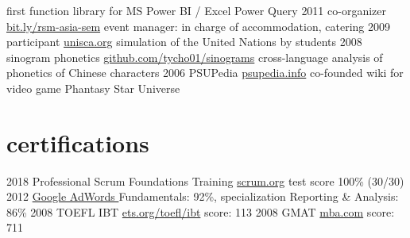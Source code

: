 \documentclass[]{friggeri-cv}
\begin{document}
\begin{entrylist}
    {
      first function library for
      MS Power BI / Excel Power Query
    }
  \entry
    {2011}
    {
      co-organizer
    }
    {\href{https://www.facebook.com/Doing-Business-in-Asia-Seminar-310520148998549/}{bit.ly/rsm-asia-sem}}
    {
      event manager:
      in charge of accommodation, catering
    }
  \entry
    {2009}
    {
      participant
    }
    {\href{http://unisca.org/}{unisca.org}}
    {
      simulation of the United Nations by students
    }
  \entry
    {2008}
    {
      sinogram phonetics
    }
    {\href{https://github.com/KiaraGrouwstra/sinograms}{github.com/tycho01/sinograms}}
    {
      cross-language analysis of phonetics of Chinese characters
    }
  \entry
    {2006}
    {PSUPedia}
    {\href{http://psupedia.info/}{psupedia.info}}
    {
      co-founded wiki for video game
      Phantasy Star Universe
    }
\end{entrylist}

\section{certifications}

\begin{entrylist}
  \entry
    {2018}
    {Professional Scrum Foundations Training}
    {\href{https://www.scrum.org/courses/professional-scrum-foundations-training}{scrum.org}}
    {test score 100\% (30/30)}
  \entry
    {2012}
    {\href{https://support.google.com/partners/answer/3154326}{Google AdWords }}
    {}
    {Fundamentals: 92\%,
    specialization
    Reporting \& Analysis: 86\%}
  \entry
    {2008}
    {TOEFL IBT}
    {\href{https://www.ets.org/toefl/ibt}{ets.org/toefl/ibt}}
    {score: 113}
  \entry
    {2008}
    {GMAT}
    {\href{https://www.mba.com/}{mba.com}}
    {score: 711}
\end{entrylist}
\end{document}
